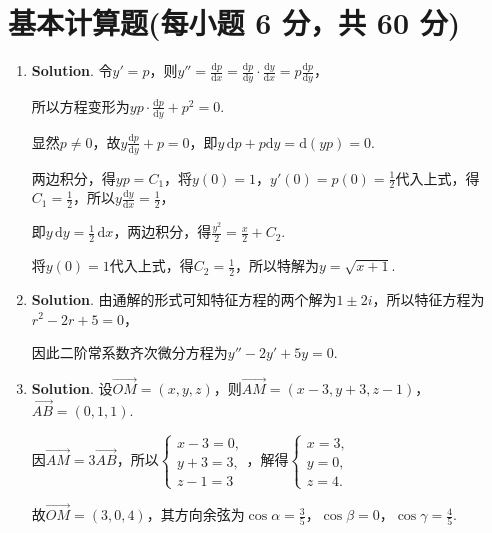 \documentclass[../main.tex]{subfiles}
\begin{document}
\section{基本计算题(每小题 6 分，共 60 分)}
\begin{enumerate}
    \item \textbf{Solution}. 令$y'=p$，则$y''=\frac{\mathrm{d}p}{\mathrm{d}x}=\frac{\mathrm{d}p}{\mathrm{d}y}
              \cdot \frac{\mathrm{d}y}{\mathrm{d}x}= p\frac{\mathrm{d}p}{\mathrm{d}y}$，

          所以方程变形为$y p \cdot \frac{\mathrm{d}p}{\mathrm{d}y}+p^{2}=0$.

          显然$p\neq0$，故$y\frac{\mathrm{d}p}{\mathrm{d}y}+p=0$，即$y\,\mathrm{d}p + p
              \mathrm{d}y = \mathrm{d}(yp) = 0$.

          两边积分，得$yp = C_{1}$，将$y(0)=1$，$y'(0)=p(0)=\frac{1}{2}$代入上式，得$C
                  _{1}= \frac{1}{2}$，所以$y\frac{\mathrm{d}y}{\mathrm{d}x}= \frac{1}{2}$，

          即$y\,\mathrm{d}y = \frac{1}{2}\,\mathrm{d}x$，两边积分，得$\frac{y^{2}}{2}= \frac{x}{2}
              + C_{2}$.

          将$y(0)=1$代入上式，得$C_{2}= \frac{1}{2}$，所以特解为$y= \sqrt{x+1}$.

    \item \textbf{Solution}. 由通解的形式可知特征方程的两个解为$1\pm 2i$，所以特征方程为$r
                  ^{2}-2r+5=0$，

          因此二阶常系数齐次微分方程为$y''-2y'+5y=0$.

    \item \textbf{Solution}. 设$\overrightarrow{OM}= (x,y,z)$，则$\overrightarrow
              {AM}= (x-3,y+3,z-1)$，$\overrightarrow{AB}= (0,1,1)$.

          因$\overrightarrow{AM}= 3\overrightarrow{AB}$，所以$\begin{cases}
                  x-3=0, \\
                  y+3=3, \\
                  z-1=3
              \end{cases}$，解得$\begin{cases}
                  x=3, \\
                  y=0, \\
                  z=4.
              \end{cases}$

          故$\overrightarrow{OM}= (3,0,4)$，其方向余弦为$\cos \alpha = \frac{3}{5}$，$\cos
              \beta = 0$，$\cos \gamma = \frac{4}{5}$.


\end{enumerate}
\end{document}
